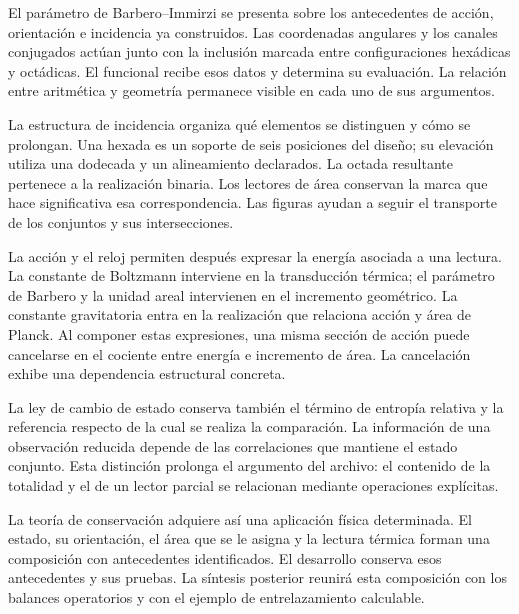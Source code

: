 
El parámetro de Barbero--Immirzi se presenta sobre los antecedentes
de acción, orientación e incidencia ya construidos. Las coordenadas
angulares y los canales conjugados actúan junto con la inclusión
marcada entre configuraciones hexádicas y octádicas. El funcional
recibe esos datos y determina su evaluación. La relación entre
aritmética y geometría permanece visible en cada uno de sus argumentos.

La estructura de incidencia organiza qué elementos se distinguen y
cómo se prolongan. Una hexada es un soporte de seis posiciones del
diseño; su elevación utiliza una dodecada y un alineamiento declarados.
La octada resultante pertenece a la realización binaria. Los lectores
de área conservan la marca que hace significativa esa correspondencia.
Las figuras ayudan a seguir el transporte de los conjuntos y sus
intersecciones.

La acción y el reloj permiten después expresar la energía asociada
a una lectura. La constante de Boltzmann interviene en la transducción
térmica; el parámetro de Barbero y la unidad areal intervienen en el
incremento geométrico. La constante gravitatoria entra en la
realización que relaciona acción y área de Planck. Al componer estas
expresiones, una misma sección de acción puede cancelarse en el
cociente entre energía e incremento de área. La cancelación exhibe
una dependencia estructural concreta.

La ley de cambio de estado conserva también el término de entropía
relativa y la referencia respecto de la cual se realiza la comparación.
La información de una observación reducida depende de las correlaciones
que mantiene el estado conjunto. Esta distinción prolonga el argumento
del archivo: el contenido de la totalidad y el de un lector parcial
se relacionan mediante operaciones explícitas.

La teoría de conservación adquiere así una aplicación física
determinada. El estado, su orientación, el área que se le asigna y
la lectura térmica forman una composición con antecedentes
identificados. El desarrollo conserva esos antecedentes y sus
pruebas. La síntesis posterior reunirá esta composición con los
balances operatorios y con el ejemplo de entrelazamiento calculable.

